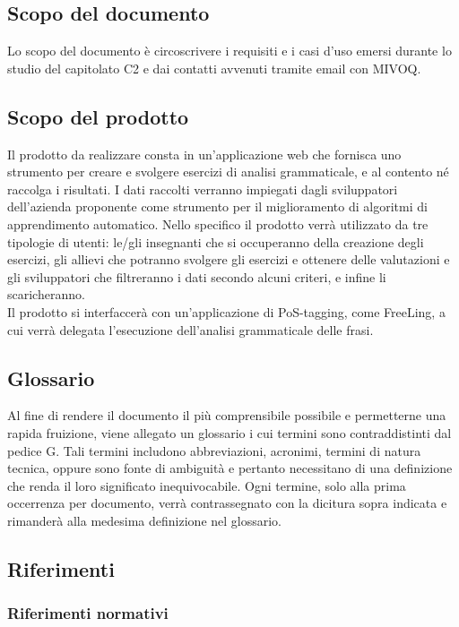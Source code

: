 \subsection{Scopo del documento}
Lo scopo del documento è circoscrivere i requisiti e i casi d’uso emersi durante lo studio del capitolato C2 e dai contatti avvenuti tramite email con MIVOQ.
\subsection{Scopo del prodotto}
Il prodotto da realizzare consta in un’applicazione web che fornisca uno strumento per creare e svolgere esercizi di analisi grammaticale, e al contento né raccolga i risultati. I dati raccolti verranno impiegati dagli sviluppatori dell’azienda proponente come strumento per il miglioramento di algoritmi di {apprendimento automatico}. Nello specifico il prodotto verrà utilizzato da tre tipologie di utenti:
le/gli insegnanti che si occuperanno della creazione degli esercizi,
gli allievi che potranno svolgere gli esercizi e ottenere delle valutazioni e gli sviluppatori che filtreranno i dati secondo alcuni criteri, e infine li scaricheranno.\\Il prodotto si interfaccerà con un’applicazione di {PoS-tagging}, come {FreeLing}, a cui verrà delegata l’esecuzione dell’analisi grammaticale delle frasi.
\subsection{Glossario}
Al fine di rendere il documento il più comprensibile possibile e permetterne una rapida fruizione, viene allegato un glossario i cui termini sono contraddistinti dal pedice G. Tali termini includono abbreviazioni, acronimi, termini di natura tecnica, oppure sono fonte di ambiguità e pertanto necessitano di una definizione che renda il loro significato inequivocabile. 
Ogni termine, solo alla prima occerrenza per documento, verrà contrassegnato con la dicitura sopra indicata e rimanderà alla medesima definizione nel glossario.
\subsection{Riferimenti}
\subsubsection{Riferimenti normativi}
\NdPv
